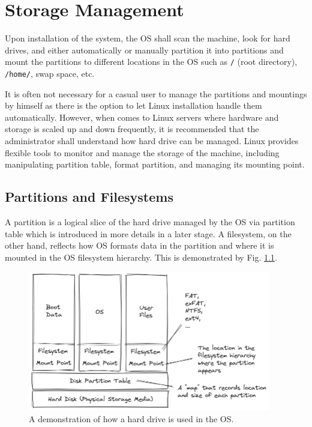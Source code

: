 \chapter{Storage Management}

Upon installation of the system, the OS shall scan the machine, look for hard drives, and either automatically or manually partition it into partitions and mount the partitions to different locations in the OS such as \verb|/| (root directory), \verb|/home/|, swap space, etc.

It is often not necessary for a casual user to manage the partitions and mountings by himself as there is the option to let Linux installation handle them automatically. However, when comes to Linux servers where hardware and storage is scaled up and down frequently, it is recommended that the administrator shall understand how hard drive can be managed. Linux provides flexible tools to monitor and manage the storage of the machine, including manipulating partition table, format partition, and managing its mounting point.

\section{Partitions and Filesystems}

A partition is a logical slice of the hard drive managed by the OS via partition table which is introduced in more details in a later stage. A filesystem, on the other hand, reflects how OS formats data in the partition and where it is mounted in the OS filesystem hierarchy. This is demonstrated by Fig. \ref{ch:dm:fig:partition}.

\begin{figure}[htbp]
	\centering
	\includegraphics[width=300pt]{chapters/part-2/figures/partition.png}
	\caption{A demonstration of how a hard drive is used in the OS.} \label{ch:dm:fig:partition}
\end{figure}

